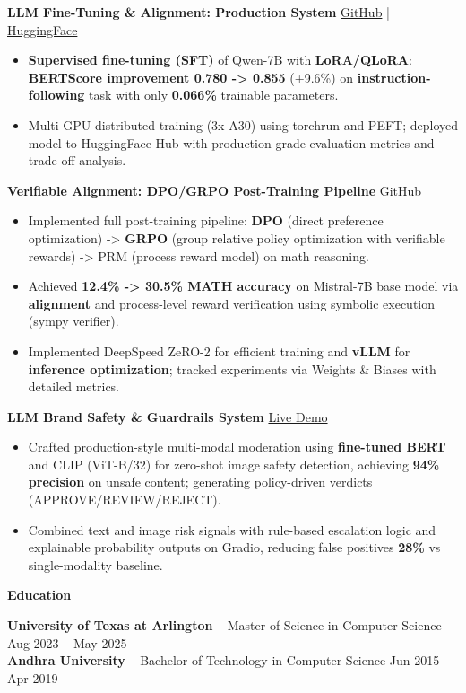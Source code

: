 \documentclass[10pt, letterpaper]{article}
\newcommand{\mysection}[1]{%
  \vspace{10pt}%
  {\noindent\large\bfseries #1}%
  \vspace{4pt}{\hrule}%
  \vspace{6pt}%
}
\newcommand{\resumeItem}[1]{\item\small{#1}}
\begin{document}
\noindent\textbf{LLM Fine-Tuning \& Alignment: Production System} \hfill \href{https://github.com/saitejasrivilli/LLM_FineTuning_SFT_Production}{GitHub} | \href{https://huggingface.co/SaiTejaSrivilli/qwen-7b-sft-merged}{HuggingFace}
\begin{itemize}
  \resumeItem{\textbf{Supervised fine-tuning (SFT)} of Qwen-7B with \textbf{LoRA/QLoRA}: \textbf{BERTScore improvement 0.780 -> 0.855} (+9.6\%) on \textbf{instruction-following} task with only \textbf{0.066\%} trainable parameters.}
  \resumeItem{Multi-GPU distributed training (3x A30) using torchrun and PEFT; deployed model to HuggingFace Hub with production-grade evaluation metrics and trade-off analysis.}
\end{itemize}

\noindent\textbf{Verifiable Alignment: DPO/GRPO Post-Training Pipeline} \hfill \href{https://github.com/saitejasrivilli/verifiable-alignment}{GitHub}
\begin{itemize}
  \resumeItem{Implemented full post-training pipeline: \textbf{DPO} (direct preference optimization) -> \textbf{GRPO} (group relative policy optimization with verifiable rewards) -> PRM (process reward model) on math reasoning.}
  \resumeItem{Achieved \textbf{12.4\% -> 30.5\% MATH accuracy} on Mistral-7B base model via \textbf{alignment} and process-level reward verification using symbolic execution (sympy verifier).}
  \resumeItem{Implemented DeepSpeed ZeRO-2 for efficient training and \textbf{vLLM} for \textbf{inference optimization}; tracked experiments via Weights \& Biases with detailed metrics.}
\end{itemize}

\noindent\textbf{LLM Brand Safety \& Guardrails System} \hfill \href{https://huggingface.co/spaces/SaiTejaSrivilli/brand-safety-guardrails}{Live Demo}
\begin{itemize}
  \resumeItem{Crafted production-style multi-modal moderation using \textbf{fine-tuned BERT} and CLIP (ViT-B/32) for zero-shot image safety detection, achieving \textbf{94\% precision} on unsafe content; generating policy-driven verdicts (APPROVE/REVIEW/REJECT).}
  \resumeItem{Combined text and image risk signals with rule-based escalation logic and explainable probability outputs on Gradio, reducing false positives \textbf{28\%} vs single-modality baseline.}
\end{itemize}

\vspace{-3mm}
\mysection{Education}
\noindent\textbf{University of Texas at Arlington} -- Master of Science in Computer Science \hfill Aug 2023 -- May 2025 \\
\noindent\textbf{Andhra University} -- Bachelor of Technology in Computer Science \hfill Jun 2015 -- Apr 2019
\end{document}
